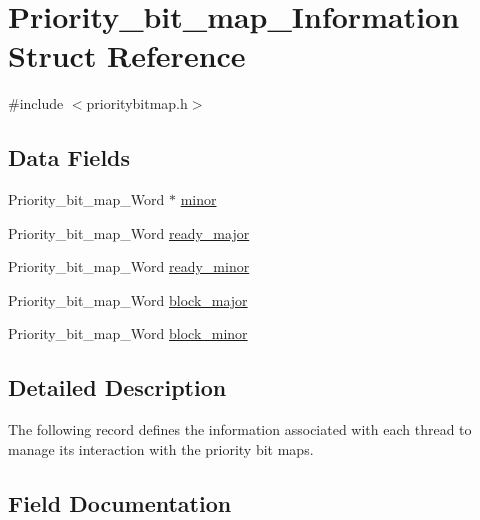 \hypertarget{structPriority__bit__map__Information}{}\section{Priority\+\_\+bit\+\_\+map\+\_\+\+Information Struct Reference}
\label{structPriority__bit__map__Information}


{\ttfamily \#include $<$prioritybitmap.\+h$>$}

\subsection*{Data Fields}
\begin{DoxyCompactItemize}
\item 
Priority\+\_\+bit\+\_\+map\+\_\+\+Word $\ast$ \mbox{\hyperlink{structPriority__bit__map__Information_afafe39803137651fa7ec4b2447cbfe59}{minor}}
\item 
Priority\+\_\+bit\+\_\+map\+\_\+\+Word \mbox{\hyperlink{structPriority__bit__map__Information_ab647b8bdef22c8986330da937bd77ea2}{ready\+\_\+major}}
\item 
Priority\+\_\+bit\+\_\+map\+\_\+\+Word \mbox{\hyperlink{structPriority__bit__map__Information_ab9a78b5deb7f2e30cb7f8b127eca291b}{ready\+\_\+minor}}
\item 
Priority\+\_\+bit\+\_\+map\+\_\+\+Word \mbox{\hyperlink{structPriority__bit__map__Information_a29ef417109591fbb9a39949428ab16cc}{block\+\_\+major}}
\item 
Priority\+\_\+bit\+\_\+map\+\_\+\+Word \mbox{\hyperlink{structPriority__bit__map__Information_a45c3e0b07f8cd036376671db043e1a88}{block\+\_\+minor}}
\end{DoxyCompactItemize}


\subsection{Detailed Description}
The following record defines the information associated with each thread to manage its interaction with the priority bit maps. 

\subsection{Field Documentation}
\mbox{\label{structPriority__bit__map__Information_a29ef417109591fbb9a39949428ab16cc}} 
